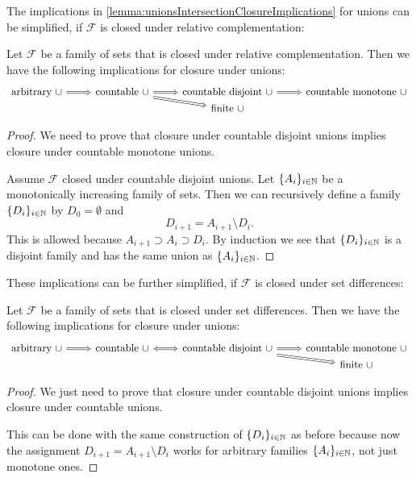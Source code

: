 The implications in \ref{lemma:unionsIntersectionClosureImplications} for unions can be simplified, if $\mathcal{F}$ is closed under relative complementation:
\begin{lemma} \label{lemma:typesOfUnionsRelativeComplementation}
Let $\mathcal{F}$ be a family of sets that is closed under relative complementation. Then we have the following implications for closure under unions:
\[ \begin{tikzcd}[row sep=0em]
\text{arbitrary $\cup$} \arrow[r, Rightarrow] & \text{countable $\cup$} \arrow[r, Rightarrow] \arrow[dr, Rightarrow] & \text{countable disjoint $\cup$} \arrow[r, Rightarrow] & \text{countable monotone $\cup$} \\
&& \text{finite $\cup$} &
\end{tikzcd} \]
\end{lemma}
\begin{proof}
We need to prove that closure under countable disjoint unions implies closure under countable monotone unions.

Assume $\mathcal{F}$ closed under countable disjoint unions. Let $\{A_i\}_{i\in \mathbb{N}}$ be a monotonically increasing family of sets. Then we can recursively define a family $\{D_i\}_{i\in \mathbb{N}}$ by $D_0=\emptyset$ and
\[ D_{i+1} = A_{i+1}\setminus D_i. \]
This is allowed because $A_{i+1}\supset A_i \supset D_i$. By induction we see that $\{D_i\}_{i\in \mathbb{N}}$ is a disjoint family and has the same union as $\{A_i\}_{i\in \mathbb{N}}$.
\end{proof}

These implications can be further simplified, if $\mathcal{F}$ is closed under set differences:
\begin{lemma}
Let $\mathcal{F}$ be a family of sets that is closed under set differences. Then we have the following implications for closure under unions:
\[ \begin{tikzcd}[row sep=0em]
\text{arbitrary $\cup$} \arrow[r, Rightarrow] & \text{countable $\cup$} \arrow[r, Leftrightarrow] & \text{countable disjoint $\cup$} \arrow[r, Rightarrow] \arrow[dr, Rightarrow] & \text{countable monotone $\cup$} \\
&&& \text{finite $\cup$}
\end{tikzcd} \]
\end{lemma}
\begin{proof}
We just need to prove that closure under countable disjoint unions implies closure under countable unions.

This can be done with the same construction of $\{D_i\}_{i\in \mathbb{N}}$ as before because now the assignment $D_{i+1} = A_{i+1}\setminus D_i$ works for arbitrary families $\{A_i\}_{i\in \mathbb{N}}$, not just monotone ones.
\end{proof}

